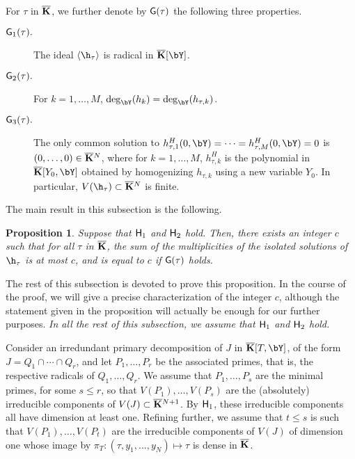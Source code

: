 \documentclass[12pt]{article}
\newtheorem{proposition}[definition]{Proposition}
\begin{document}
For $\tau$ in $\overline{\mathbf{K}}$, we further denote by ${\sf G}(\tau)$ the
following three properties.
\begin{description}
\item[${\sf G}_1(\tau).$] The ideal $\langle \h_\tau \rangle$ is
  radical in $\KKbar[\bY]$.
\item[${\sf G}_2(\tau).$] For $k=1,\dots,M$,
  $\deg_\bY(h_k)=\deg_\bY(h_{\tau,k})$.
\item[${\sf G}_3(\tau).$] The only common solution to
  $h_{\tau,1}^H(0,\bY)=\cdots=h_{\tau,M}^H(0,\bY)=0$ is
  $(0,\dots,0)\in\overline{\mathbf{K}}{}^N$, where for $k=1,\dots,M$, $h_{\tau,k}^H$ is
  the polynomial in $\KKbar[Y_0,\bY]$ obtained by homogenizing
  $h_{\tau,k}$ using a new variable $Y_0$. In particular, $V(\h_\tau)
  \subset \KKbar{}^N$ is finite.
\end{description}

The main result in this subsection is the following.
\begin{proposition}\label{prop:degree_fiber}
  Suppose that ${\sf H}_1$ and ${\sf H}_2$ hold. Then, there exists an
  integer $c$ such that for all $\tau$ in $\overline{\mathbf{K}}$, the sum of the
  multiplicities of the isolated solutions of $\h_\tau$ is at most
  $c$, and is equal to $c$ if ${\sf G}(\tau)$ holds.
\end{proposition}

The rest of this subsection is devoted to prove this proposition. In
the course of the proof, we will give a precise characterization
of the integer $c$, although the statement given in the proposition
will actually be enough for our further purposes. {\em In all the rest
  of this subsection, we assume that ${\sf H}_1$ and ${\sf H}_2$
  hold.}

\medskip

Consider an irredundant primary decomposition of $J$ in
$\KKbar[T,\bY]$, of the form $J=Q_1 \cap \cdots
\cap Q_r$, and let $P_1,\dots,P_r$ be the associated primes, that is,
the respective radicals of $Q_1,\dots,Q_r$. We assume that
$P_1,\dots,P_s$ are the minimal primes, for some $s \le r$, so that
$V(P_1),\dots,V(P_s)$ are the (absolutely) irreducible components of
$V(J)\subset \overline{\mathbf{K}}{}^{N+1}$. By ${\sf H}_1$, these irreducible
components all have dimension at least one. Refining further, we
assume that $t \le s$ is such that $V(P_1),\dots,V(P_t)$ are the
 irreducible components of $V(J)$ of dimension one whose
image by $\pi_T: (\tau,y_1,\dots,y_N) \mapsto \tau$ is dense in
$\overline{\mathbf{K}}$.
\end{document}
